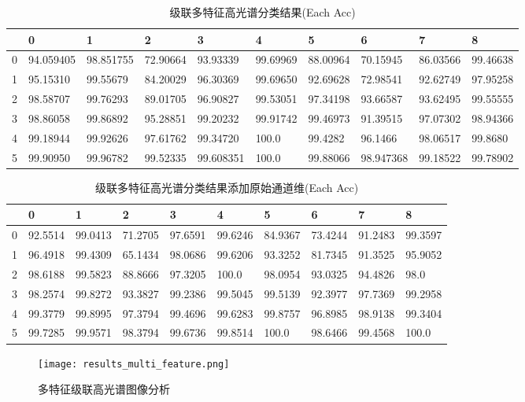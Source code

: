 \documentclass[runningheads]{llncs}
\begin{document}
\begin{table}[]
\centering
\setlength\tabcolsep{8pt}
\caption{级联多特征高光谱分类结果(Each Acc)}
\label{tab:my-table}
\begin{tabular}{llllllllll}
\toprule
 &
  0 &
  1 &
  2 &
  3 &
  4 &
  5 &
  6 &
  7 &
  8 \\
  \midrule
0 &
  94.059405 &
  98.851755 &
  72.90664&
  93.93339 &
  99.69969&
  88.00964 &
  70.15945 &
  86.03566 &
  99.46638 \\
1 &
  95.15310 &
  99.55679 &
  84.20029 &
  96.30369 &
  99.69650 &
  92.69628 &
  72.98541 &
  92.62749 &
  97.95258 \\
2 &
  98.58707 &
  99.76293 &
  89.01705 &
  96.90827 &
  99.53051 &
  97.34198 &
  93.66587 &
  93.62495 &
  99.55555 \\
3 &
  98.86058 &
  99.86892 &
  95.28851  &
  99.20232  &
  99.91742 &
  99.46973  &
  91.39515 &
  97.07302 &
  98.94366 \\
4 &
  99.18944 &
  99.92626 &
  97.61762 &
  99.34720 &
  100.0 &
  99.4282&
  96.1466&
  98.06517 &
  99.8680 \\
5 &
  99.90950 &
  99.96782 &
  99.52335 &
  99.608351 &
  100.0 &
  99.88066&
  98.947368 &
  99.18522 &
  99.78902\\
  \bottomrule
\end{tabular}
\end{table}
\begin{table}[]
\centering
\setlength\tabcolsep{12pt}
\caption{级联多特征高光谱分类结果添加原始通道维(Each Acc)}
\label{tab:my-table}
\begin{tabular}{llllllllll}
\toprule
  & 0       & 1       & 2       & 3       & 4       & 5       & 6       & 7       & 8       \\
  \midrule
0 & 92.5514 & 99.0413 & 71.2705 & 97.6591 & 99.6246 & 84.9367 & 73.4244 & 91.2483 & 99.3597 \\
1 & 96.4918 & 99.4309 & 65.1434 & 98.0686 & 99.6206 & 93.3252 & 81.7345 & 91.3525 & 95.9052 \\
2 & 98.6188 & 99.5823 & 88.8666 & 97.3205 & 100.0   & 98.0954 & 93.0325 & 94.4826 & 98.0    \\
3 & 98.2574 & 99.8272 & 93.3827 & 99.2386 & 99.5045 & 99.5139 & 92.3977 & 97.7369 & 99.2958 \\
4 & 99.3779 & 99.8995 & 97.3794 & 99.4696 & 99.6283 & 99.8757 & 96.8985 & 98.9138 & 99.3404 \\
5 & 99.7285 & 99.9571 & 98.3794 & 99.6736 & 99.8514 & 100.0   & 98.6466 & 99.4568 & 100.0\\
\bottomrule
\end{tabular}
\end{table}
\begin{figure}[t]  %
\centering
\texttt{[image: results\_multi\_feature.png]}
\caption{多特征级联高光谱图像分析}
\end{figure}
\end{document}
